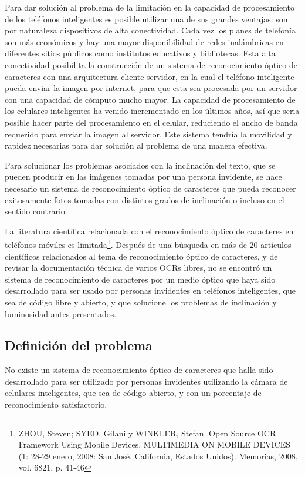 \documentclass[a4paper, 11pt, oneside]{report}
\begin{document}
Para dar solución al problema de la limitación en la capacidad de procesamiento de los teléfonos inteligentes es posible utilizar una de sus grandes ventajas: son por naturaleza dispositivos de alta conectividad. Cada vez los planes de telefonía son más económicos y hay una mayor disponibilidad de redes inalámbricas en diferentes sitios públicos como institutos educativos y bibliotecas. Esta alta conectividad posibilita la construcción de un sistema de reconocimiento óptico de caracteres con una arquitectura cliente-servidor, en la cual el teléfono inteligente pueda enviar la imagen por internet, para que esta sea procesada por un servidor con una capacidad de cómputo mucho mayor. La capacidad de procesamiento de los celulares inteligentes ha venido incrementado en los últimos años, así que seria posible hacer parte del procesamiento en el celular, reduciendo el ancho de banda requerido para enviar la imagen al servidor. Este sistema tendría la movilidad y rapidez necesarias para dar solución al problema de una manera efectiva.

Para solucionar los problemas asociados con la inclinación del texto, que se pueden producir en las imágenes tomadas por una persona invidente, se hace necesario un sistema de reconocimiento óptico de caracteres que pueda reconocer exitosamente fotos tomadas con distintos grados de inclinación o incluso en el sentido contrario.

La literatura científica relacionada con el reconocimiento óptico de caracteres en teléfonos móviles es limitada\footnote{ZHOU, Steven; SYED, Gilani y WINKLER, Stefan. Open Source OCR Framework Using Mobile Devices. MULTIMEDIA ON MOBILE DEVICES (1: 28-29 enero, 2008: San José, California, Estados Unidos). Memorias, 2008, vol. 6821, p. 41-46}. Después de una búsqueda en más de 20 artículos científicos relacionados al tema de reconocimiento óptico de caracteres, y de revisar la documentación técnica de varios OCRs libres, no se encontró un sistema de reconocimiento de caracteres por un medio óptico que haya sido desarrollado para ser usado por personas invidentes en teléfonos inteligentes, que sea de código libre y abierto, y que solucione los problemas de inclinación y luminosidad antes presentados.

\subsection{Definición del problema}

No existe un sistema de reconocimiento óptico de caracteres que halla sido desarrollado para ser utilizado por personas invidentes utilizando la cámara de celulares inteligentes, que sea de código abierto, y con un porcentaje de reconocimiento satisfactorio.
\end{document}
